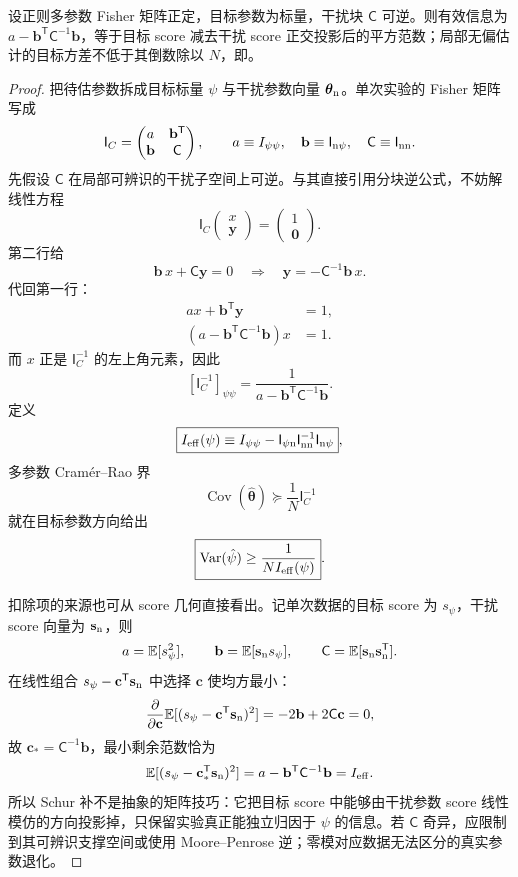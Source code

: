\begin{proposition}
设正则多参数 Fisher 矩阵正定，目标参数为标量，干扰块 $\mathsf C$ 可逆。则有效信息为 $a-\mathbf b^{\mathsf T}\mathsf C^{-1}\mathbf b$，等于目标 score 减去干扰 score 正交投影后的平方范数；局部无偏估计的目标方差不低于其倒数除以 $N$，即。
\end{proposition}
\begin{proof}
把待估参数拆成目标标量 $\psi$ 与干扰参数向量 $\boldsymbol\theta_{\rm n}$。单次实验的 Fisher 矩阵写成
\[
\mathsf I_C=
\begin{pmatrix}
 a & \mathbf b^{\mathsf T}\\
 \mathbf b & \mathsf C
\end{pmatrix},
\qquad
 a\equiv I_{\psi\psi},\quad
 \mathbf b\equiv\mathsf I_{{\rm n}\psi},\quad
 \mathsf C\equiv\mathsf I_{{\rm n}{\rm n}}.
\]
先假设 $\mathsf C$ 在局部可辨识的干扰子空间上可逆。与其直接引用分块逆公式，不妨解线性方程
\[
\mathsf I_C
\begin{pmatrix}x\\ \mathbf y\end{pmatrix}
=
\begin{pmatrix}1\\ \mathbf 0\end{pmatrix}.
\]
第二行给
\[
\mathbf b\,x+\mathsf C\mathbf y=0
\quad\Longrightarrow\quad
\mathbf y=-\mathsf C^{-1}\mathbf b\,x.
\]
代回第一行：
\begin{align*}
ax+\mathbf b^{\mathsf T}\mathbf y&=1,\\
\left(a-\mathbf b^{\mathsf T}\mathsf C^{-1}\mathbf b\right)x&=1.
\end{align*}
而 $x$ 正是 $\mathsf I_C^{-1}$ 的左上角元素，因此
\[
[\mathsf I_C^{-1}]_{\psi\psi}
=\frac{1}{a-\mathbf b^{\mathsf T}\mathsf C^{-1}\mathbf b}.
\]
定义
\[
\boxed{
I_{\rm eff}(\psi)
\equiv
I_{\psi\psi}
-\mathsf I_{\psi{\rm n}}
\mathsf I_{{\rm n}{\rm n}}^{-1}
\mathsf I_{{\rm n}\psi}},
\]
多参数 Cram\'er--Rao 界
\[
\operatorname{Cov}(\hat{\boldsymbol\theta})
\succeq\frac1N\mathsf I_C^{-1}
\]
就在目标参数方向给出
\[
\boxed{
\operatorname{Var}(\hat\psi)
\ge\frac1{N I_{\rm eff}(\psi)}}.
\]

扣除项的来源也可从 score 几何直接看出。记单次数据的目标 score 为 $s_\psi$，干扰 score 向量为 $\mathbf s_{\rm n}$，则
\[
a=\mathbb E[s_\psi^2],\qquad
\mathbf b=\mathbb E[\mathbf s_{\rm n}s_\psi],\qquad
\mathsf C=\mathbb E[\mathbf s_{\rm n}\mathbf s_{\rm n}^{\mathsf T}].
\]
在线性组合 $s_\psi-\mathbf c^{\mathsf T}\mathbf s_{\rm n}$ 中选择 $\mathbf c$ 使均方最小：
\[
\frac{\partial}{\partial\mathbf c}
\mathbb E[(s_\psi-\mathbf c^{\mathsf T}\mathbf s_{\rm n})^2]
=-2\mathbf b+2\mathsf C\mathbf c=0,
\]
故 $\mathbf c_*=\mathsf C^{-1}\mathbf b$，最小剩余范数恰为
\[
\mathbb E[(s_\psi-\mathbf c_*^{\mathsf T}\mathbf s_{\rm n})^2]
=a-\mathbf b^{\mathsf T}\mathsf C^{-1}\mathbf b
=I_{\rm eff}.
\]
所以 Schur 补不是抽象的矩阵技巧：它把目标 score 中能够由干扰参数 score 线性模仿的方向投影掉，只保留实验真正能独立归因于 $\psi$ 的信息。若 $\mathsf C$ 奇异，应限制到其可辨识支撑空间或使用 Moore--Penrose 逆；零模对应数据无法区分的真实参数退化。
\end{proof}


